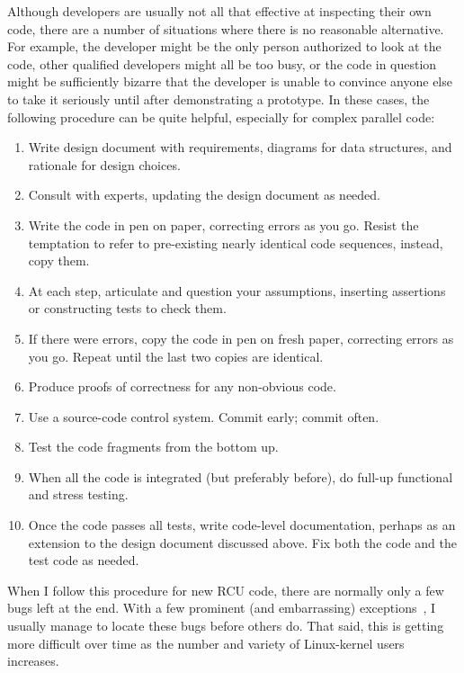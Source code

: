 Although developers are usually not all that effective at inspecting
their own code, there are a number of situations where there is no
reasonable alternative.
For example, the developer might be the only person authorized to look
at the code, other qualified developers might all be too busy, or
the code in question might be sufficiently bizarre that the developer
is unable to convince anyone else to take it seriously until after
demonstrating a prototype.
In these cases, the following procedure can be quite helpful,
especially for complex parallel code:

\begin{enumerate}
\item	Write design document with requirements, diagrams for data structures,
	and rationale for design choices.
\item	Consult with experts, updating the design document as needed.
\item	Write the code in pen on paper, correcting errors as you go.
	Resist the temptation to refer to pre-existing nearly identical code
	sequences, instead, copy them.
\item	At each step, articulate and question your assumptions,
	inserting assertions or constructing tests to check them.
\item	If there were errors, copy the code in pen on fresh paper, correcting
	errors as you go.
	Repeat until the last two copies are identical.
\item	Produce proofs of correctness for any non-obvious code.
\item	Use a source-code control system.
	Commit early; commit often.
\item	Test the code fragments from the bottom up.
\item	When all the code is integrated (but preferably before),
	do full-up functional and stress testing.
\item	Once the code passes all tests, write code-level documentation,
	perhaps as an extension to the design document discussed above.
	Fix both the code and the test code as needed.
\end{enumerate}

When I follow this procedure for new RCU code, there are normally only
a few bugs left at the end.
With a few prominent (and embarrassing)
exceptions~\cite{PaulEMcKenney2011RCU3.0trainwreck},
I usually manage to locate these bugs before others do.
That said, this is getting more difficult over time as the number and
variety of Linux-kernel users increases.

